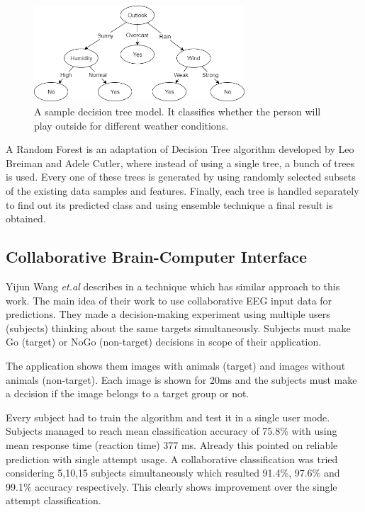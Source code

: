 \documentclass[12pt]{article}
\theoremstyle{definition}
\begin{document}
\begin{figure} [H]
\begin{center}
\includegraphics[width=0.7\textwidth]{decisiontree}
\caption{A sample decision tree model. It classifies whether the person will play outside for different weather conditions.}
\end{center}
\end{figure}

A Random Forest is an adaptation of Decision Tree algorithm developed by Leo Breiman and Adele Cutler, where instead of using a single tree, a bunch of trees is used. Every one of these trees is generated by using randomly selected subsets of the existing data samples and features. Finally, each tree is handled separately to find out its predicted class and using ensemble technique a final result is obtained. \cite{breiman_rf}

\subsection{Collaborative Brain-Computer Interface}

Yijun Wang {\it et.al} describes in \cite{collaborative_wang} a technique which has similar approach to this work. The main idea of their work to use collaborative EEG input data for predictions. They made a decision-making experiment using multiple users (subjects) thinking about the same targets simultaneously. Subjects must make Go (target) or NoGo (non-target) decisions in scope of their application. 

The application shows them images with animals (target) and images without animals (non-target). Each image is shown for 20ms and the subjects must make a decision if the image belongs to a target group or not.

Every subject had to train the algorithm and test it in a single user mode. Subjects managed to reach mean classification accuracy of 75.8\% with using mean response time (reaction time) 377 ms. Already this pointed on reliable prediction with single attempt usage. A collaborative classification was tried considering 5,10,15 subjects simultaneously which resulted 91.4\%, 97.6\% and 99.1\% accuracy respectively. This clearly shows improvement over the single attempt classification. 
\end{document}
